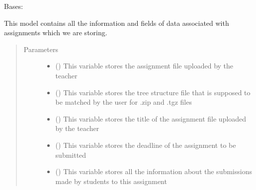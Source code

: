 \documentclass[letterpaper,10pt,english]{sphinxmanual}
\begin{document}

\begin{fulllineitems}
\label{\detokenize{users:users.models.assignments}}
\sphinxAtStartPar
Bases: 

\sphinxAtStartPar
This model contains all the information and fields of data associated with assignments which we are storing.
\begin{quote}\begin{description}
\item[{Parameters}] \leavevmode\begin{itemize}
\item {} 
\sphinxAtStartPar
{} () \textendash{} This variable stores the assignment file uploaded by the teacher

\item {} 
\sphinxAtStartPar
{} () \textendash{} This variable stores the tree structure file that is supposed to be matched by the user for .zip and .tgz files

\item {} 
\sphinxAtStartPar
{} () \textendash{} This variable stores the title of the assignment file uploaded by the teacher

\item {} 
\sphinxAtStartPar
{} () \textendash{} This variable stores the deadline of the assignment to be submitted

\item {} 
\sphinxAtStartPar
{} (\sphinxstyleliteralemphasis{\sphinxupquote{)}}) \textendash{} This variable stores all the information about the submissions made by students to this assignment


\end{itemize}
\end{description}
\end{quote}
\end{fulllineitems}
\end{document}
